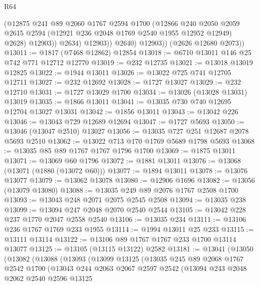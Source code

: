 \begin{lexlean}{R64}
\begin{coremodule}
                    (@12875
                      @241
                      @89
                      @2060
                      @1767
                      @2594
                      @1700
                      (@12866
                        @240
                        @2050
                        @2059
                        @2615
                        @2594
                        (@12921 @236 @2048 @1769 @2540 @1955 @12952 @12949)
                        @2628)
                      @12903))
                  @2634)
                @12903))
            @2640)
          @12903))
      (@2626 @12680 @2073))
@13011 := @1817 (@7468 @12862) @12854
@13018 := @6710 @13011 @146 @25 @742 @771 @12712 @12770
@13019 := @232 @12735
@13021 := @13018 @13019 @12825
@13022 := @1944 @13011
@13026 := @13022 @725 @741 @12705 @12711
@13027 := @232 @12692
@13028 := @1727 @13027
@13029 := @232 @12710
@13031 := @1727 @13029 @1700
@13034 := @13026 (@13028 @13031) @13019
@13035 := @1866 @13011
@13041 := @13035 @730 @740 @12695 @12704 @13027 @13031
@13042 := @1856 @13011
@13043 := @13042 @226
@13046 := @13043 @729 @12689 @12694
@13047 := @1727 @5693
@13050 := @13046 (@13047 @2510) @13027
@13056 := @13035 @727 @251 @12687 @2078 @5693 @2510
@13062 := @13022 @713 @170 @1769 @5689 @1798 @5693
@13068 := @13035 @85 @89 @1767 @1767 @1796 @1700
@13069 := @1875 @13011
@13071 := @13069 @60 @1796
@13072 := @1881 @13011
@13076 := @13068 (@13071 (@1880 (@13072 @60)))
@13077 := @1894 @13011
@13078 := @13076 @13077
@13079 := @13062 @13078
@13080 := @12906 @1696
@13082 := @13056 (@13079 @13080)
@13088 := @13035 @249 @89 @2076 @1767 @2508 @1700
@13093 := @13043 @248 @2071 @2075 @2545 @2508
@13094 := @13035 @238
@13099 := @13094 @247 @2048 @2070 @2540 @2544
@13105 := @13042 @228 @237 @1770 @2047 @2558 @2540
@13106 := @13035 @234
@13111 := @13106 @236 @1767 @1769 @233 @1955
@13114 := @1994 @13011 @25 @233
@13115 := @13111 @13114
@13122 := @13106 @89 @1767 @1767 @233 @1700 @13114 @13077
@13125 := @13105 (@13115 @13122) @2582
@13181 := @13041
    (@13050
      (@13082
        (@13088
          (@13093
            (@13099
              @13125
              (@13035
                @245
                @89
                @2068
                @1767
                @2542
                @1700
                (@13043
                  @244
                  @2063
                  @2067
                  @2597
                  @2542
                  (@13094
                    @243
                    @2048
                    @2062
                    @2540
                    @2596
                    @13125

\end{coremodule}
\end{lexlean}
